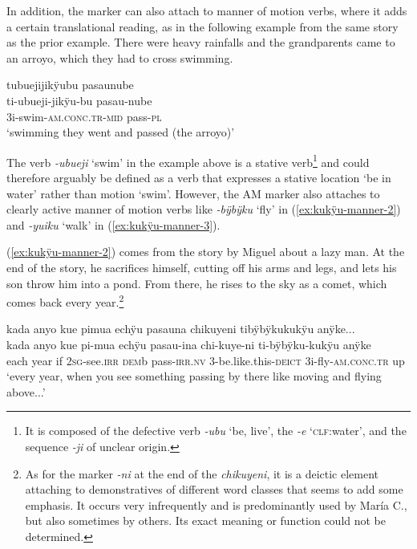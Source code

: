 In addition, the marker can also attach to  manner of motion verbs, where it adds a certain translational reading, as in the following example from the same story as the prior example. There were heavy rainfalls and the grandparents came to an arroyo, which they had to cross swimming.

\ea\label{ex:kukÿu-manner-1}
\begingl 
\glpreamble tubuejijikÿubu pasaunube\\
\gla ti-ubueji-jikÿu-bu pasau-nube\\ 
\glb 3i-swim-\textsc{am.conc.tr}-\textsc{mid} pass-\textsc{pl}\\ 
\glft ‘swimming they went and passed (the arroyo)’
\trailingcitation{[jxx-p151016l-2]}
\xe

The verb \textit{-ubueji} ‘swim’ in the example above is a stative verb\footnote{It is composed of the defective verb \textit{-ubu} ‘be, live’, the  \textit{-e} ‘\textsc{clf}:water’, and the sequence \textit{-ji} of unclear origin.} and could therefore arguably be defined as a verb that expresses a stative location ‘be in water’ rather than motion ‘swim’. However, the AM marker also attaches to clearly active  manner of motion verbs like \textit{-bÿbÿku} ‘fly’ in (\ref{ex:kukÿu-manner-2}) and \textit{-yuiku} ‘walk’ in (\ref{ex:kukÿu-manner-3}).

(\ref{ex:kukÿu-manner-2}) comes from the story by Miguel about a lazy man. At the end of the story, he sacrifices himself, cutting off his arms and legs, and lets his son throw him into a pond. From there, he rises to the sky as a comet, which comes back every year.\footnote{As for the marker \textit{-ni} at the end of the  \textit{chikuyeni}, it is a deictic element attaching to demonstratives of different word classes that seems to add some emphasis. It occurs very infrequently and is predominantly used by María C., but also sometimes by others. Its exact meaning or function could not be determined.}

\ea\label{ex:kukÿu-manner-2}
\begingl 
\glpreamble kada anyo kue pimua echÿu pasauna chikuyeni tibÿbÿkukukÿu anÿke...\\
\gla kada anyo kue pi-mua echÿu pasau-ina chi-kuye-ni ti-bÿbÿku-kukÿu anÿke\\ 
\glb each year if 2\textsc{sg}-see.\textsc{irr} \textsc{dem}b pass-\textsc{irr.nv} 3-be.like.this-\textsc{deict} 3i-fly-\textsc{am.conc.tr} up\\ 
\glft ‘every year, when you see something passing by there like moving and flying above...’
\trailingcitation{[mox-n110920l.128]}
\xe
{}

